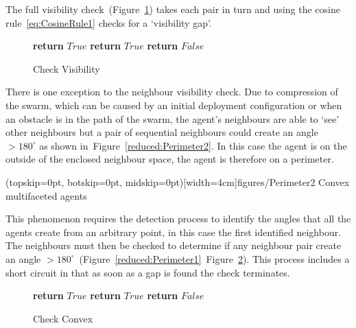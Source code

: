 \documentclass{ieeeaccess}
\begin{document}
The full visibility check~(Figure~\ref{algo:CheckVisibility}) takes each pair in turn and using the cosine rule~\eqref{eq:CosineRule1} checks for a `visibility gap'. 

\begin{figure}
\begin{algorithmic}
\tiny
{}
			\State\textbf{return} $True$
   	\EndIf
		\State\textbf{return} $True$
	\EndIf
\EndFor
\State\textbf{return} $False$
\EndProcedure
\end{algorithmic}
\caption{Check Visibility}
\label{algo:CheckVisibility}
\end{figure}

There is one exception to the neighbour visibility check. Due to compression of the swarm, which can be caused by an initial deployment configuration or when an obstacle is in the path of the swarm, the agent's neighbours are able to `see' other neighbours but a pair of sequential neighbours could create an angle $> 180^\circ$ as shown in~Figure~\ref{reduced:Perimeter2}. In this case the agent is on the outside of the enclosed neighbour space, the agent is therefore on a perimeter. 

\Figure[t!](topskip=0pt, botskip=0pt, midskip=0pt)[width=4cm]{figures/Perimeter2}
{Convex multifaceted agents\label{reduced:Perimeter2}}


This phenomenon requires the detection process to identify the angles that all the agents create from an arbitrary point, in this case the first identified neighbour. The neighbours must then be checked to determine if any neighbour pair create an angle $> 180^\circ$~(Figure~\ref{reduced:Perimeter1}~Figure~\ref{algo:CheckConvex}). This process includes a short circuit in that as soon as a gap is found the check terminates. 

\begin{figure}
\begin{algorithmic}
\tiny
{}
			\State\textbf{return} $True$
		\EndIf
	\EndIf
		\State\textbf{return} $True$
	\EndIf
\EndFor
\State\textbf{return} $False$
\EndProcedure
\end{algorithmic}
\caption{Check Convex}
\label{algo:CheckConvex}
\end{figure}
\end{document}
